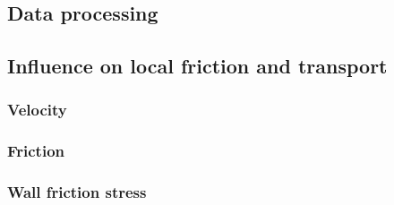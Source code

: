 \subsection{Data processing}
\subsection{Influence on local friction and transport}
\subsubsection{Velocity}
\subsubsection{Friction}
\subsubsection{Wall friction stress}